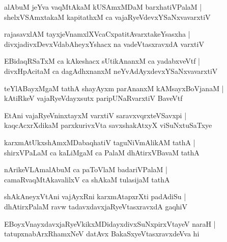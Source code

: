 \documentclass[twoside,12pt,openright]{book}
\newcounter{shloka}[chapter]
\begin{document}
\begin{shloka}%
alAbuM jeYva vaqMtAkaM kUSAmxMDaM barxhatiVPalaM |\\
shelxVSAmxtakaM kapitathxM ca vajaRyeVdevxYSaNxvavarxtiV 
\end{shloka}

\begin{shloka}%
rajasavxlAM tayxjeVnamxlXVcaCxpatitAvarxtakeYsasxha |\\
divxjadivxDevxVdabAheyxYshacx na vadeVtasxravxdA varxtiV 
\end{shloka}

\begin{shloka}%
EBidaqRSaTxM ca kAkeshacx sUtikAnanxM ca yadabxveVtf |\\
divxHpAcitaM ca dagAdhxnanxM neYvAdAyxdevxYSaNxvavarxtiV
\end{shloka}

\begin{shloka}%
teYlABayxMgaM  tathA shayAyxm parAnanxM kAMsayxBoVjanaM |\\
kAtiRkeV vajaRyeVdayxsutx paripUNaRvarxtiV BaveVtf
\end{shloka}

\begin{shloka}%
EtAni vajaRyeVninxtayxM varxtiV saravxvqrxteVSavxpi |\\
kaqcAcxrXdikaM parxkurivxVta savxshakAtxyX viSuNxtuSaTxye
\end{shloka}

\begin{shloka}%
karxmAtUkxshAmxMDabaqhatiV taguNiVmAlikAM tathA |\\
shirxVPaLaM ca kaLiMgaM ca PalaM dhAtirxVBavaM tathA 
\end{shloka}

\begin{shloka}%
nArikeVLAmalAbuM ca paToVlaM badariVPalaM |\\
camaRvaqMtAkavalilxV ca shAkaM tulasijaM tathA 
\end{shloka}

\begin{shloka}%
shAkAneyxVtAni vajAyxRni karxmAtapxrXti padAdiSu |\\
dhAtirxPalaM ravw tadavxdavxjaRyeVtasxravxdA gaqhiV 
\end{shloka}

\begin{shloka}%
EBoyxVnayxdavxjaRyeVkikxMDidayxdivxSuNxpirxVtayeV naraH |\\
tatupxnabArxRhamxNeV datAvx BakaSxyeVtasxravxdeVva hi
\end{shloka}
\end{document}
